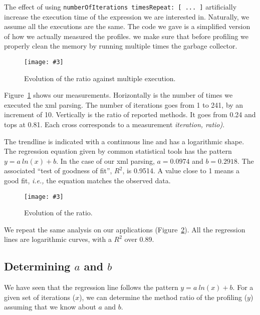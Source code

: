 \documentclass{sig-alternate}
\newcommand{\ct}{\lstinline[backgroundcolor=\color{white},basicstyle=\footnotesize\ttfamily]}
\newcommand{\fig}[4]{
	\begin{figure}[#1]
		\centering
		\texttt{[image: \#3]}
		\caption{\label{fig:#3}#4}
	\end{figure}}
\newcommand{\ie}{\emph{i.e.,}\xspace}
\newcommand{\figref}[1]{Figure~\ref{fig:#1}}
\begin{document}
The effect of using \ct{numberOfIterations timesRepeat: [ ... ]} artificially increase the execution time of the expression we are interested in. Naturally, we assume all the executions are the same. The code we gave is a simplified version of how we actually measured the profiles. we make sure that before profiling we properly clean the memory by running multiple times the garbage collector.

%

\fig{h}{0.5}{IterationEvolution}{Evolution of the ratio against multiple execution.}

\figref{IterationEvolution} shows our measurements. Horizontally is the number of times we executed the xml parsing. The number of iterations goes from 1 to 241, by an increment of 10. Vertically is the ratio of reported methods. It goes from 0.24 and tops at 0.81. Each cross corresponds to a measurement \textit{iteration, ratio)}.

The trendline is indicated with a continuous line and has a logarithmic shape. The regression equation given by common statistical tools has the pattern $y = a~ln(x) + b$. In the case of our xml parsing, $a = 0.0974$ and $b = 0.2918$. The associated ``test of goodness of fit'', $R^2$, is 0.9514. A value close to 1 means a good fit, \ie the equation matches the observed data.

\fig{h}{0.5}{IterationEvolutionForApplications}{Evolution of the ratio.}
We repeat the same analysis on our applications (\figref{IterationEvolutionForApplications}). All the regression lines are logarithmic curves, with a $R^2$ over 0.89. 

\subsection{Determining $a$ and $b$}

We have seen that the regression line follows the pattern $y = a~ln(x) + b$. For a given set of iterations ($x$), we can determine the method ratio of the profiling ($y$) assuming that we know about $a$ and $b$. 
\end{document}
